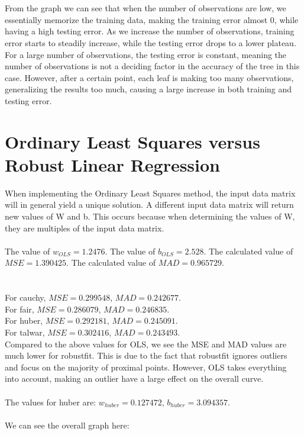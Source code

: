 \documentclass[paper=a4, fontsize=11pt]{scrartcl} %
\numberwithin{equation}{section} %
\numberwithin{figure}{section} %
\numberwithin{table}{section} %
\begin{document}
	\\\\
	From the graph we can see that when the number of observations are low, we essentially memorize the training data, making the training error almost 0, while having a high testing error. As we increase the number of observations, training error starts to steadily increase, while the testing error drops to a lower plateau. For a large number of observations, the testing error is constant, meaning the number of observations is not a deciding factor in the accuracy of the tree in this case. However, after a certain point, each leaf is making too many observations, generalizing the results too much, causing a large increase in both training and testing error.
	\newpage
	\section{Ordinary Least Squares versus Robust Linear Regression}
	When implementing the Ordinary Least Squares method, the input data matrix will in general yield a unique solution. A different input data matrix will return new values of W and b. This occurs because when determining the values of W, they are multiples of the input data matrix.
	\\\\
	The value of $w_{OLS} = 1.2476$. The value of $b_{OLS} = 2.528$. The calculated value of $MSE = 1.390425$. The calculated value of $MAD = 0.965729$.
	\\\\\\
	For cauchy, $MSE = 0.299548$, $MAD = 0.242677$.\\
	For fair, $MSE = 0.286079$, $MAD = 0.246835$.\\
	For huber, $MSE = 0.292181$, $MAD = 0.245091$.\\
	For talwar, $MSE = 0.302416$, $MAD = 0.243493$.\\
	Compared to the above values for OLS, we see the MSE and MAD values are much lower for robustfit. This is due to the fact that robustfit ignores outliers and focus on the majority of proximal points. However, OLS takes everything into account, making an outlier have a large effect on the overall curve.
	\\\\
	The values for huber are: $w_{huber} = 0.127472$, $b_{huber} = 3.094357$.
	\\\\
	We can see the overall graph here:
	\\\\
\end{document}
